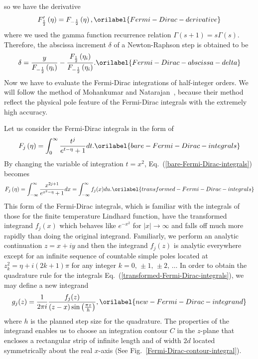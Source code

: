 \documentclass[aps,showkeys,noshowpacs,superscriptaddress,pre,preprint]{revtex4-2}
\let\label\orilabel
\begin{document}
so we have the derivative
\begin{equation}
F_{\frac{1}{2}}^\prime \left( \eta \right) 
= F_{-\frac{1}{2}} \left( \eta \right) ,
\label{Fermi-Dirac-derivative}
\end{equation}
where we used the gamma function recurrence relation 
$\Gamma \left( s + 1 \right) = s \Gamma \left( s \right)$.
Therefore, the abscissa increment $\delta$ of a Newton-Raphson step is obtained to be
\begin{equation}
\delta = \frac{y}{F_{-\frac{1}{2}} \left( \eta_i \right) } -
\frac{F_{\frac{1}{2}} \left( \eta_i \right) }{F_{- \frac{1}{2}} \left( \eta_i \right) } .
\label{Fermi-Dirac-abscissa-delta}
\end{equation}
Now we have to evaluate the Fermi-Dirac integrations of half-integer orders.
We will follow the method of Mohankumar and Natarajan~\cite{Mohankumar-Natarajan1995,Mohankumar-Natarajan1996},
because their method reflect the physical pole feature of the Fermi-Dirac integrals with the extremely high accuracy.

Let us consider the Fermi-Dirac integrals in the form of
\begin{equation}
F_j \left( \eta \right) = \int_0^\infty \frac{t^j}{e^{t-\eta} + 1} dt .
\label{bare-Fermi-Dirac-integrals}
\end{equation}
By changing the variable of integration $t = x^2$,
Eq.~(\ref{bare-Fermi-Dirac-integrals}) becomes
\begin{equation}
F_j \left( \eta \right) = \int_{-\infty}^{\infty} \frac{x^{2j+1}}{e^{x^2 - \eta} + 1} dx
= \int_{-\infty}^{\infty} {f_j (x)} du .
\label{transformed-Fermi-Dirac-integrals}
\end{equation}
This form of the Fermi-Dirac integrals, 
which is familiar with the integrals of those for the finite temperature Lindhard function,
have the transformed integrand ${f_j (x)}$ which behaves like $e^{- x^2}$ for $\left\vert x \right\vert \rightarrow \infty$
and falls off much more rapidly than doing the original integrand.
Familiarly, we perform an analytic continuation $z = x + i y$ and then
the integrand ${f_j (z)}$ is analytic everywhere except for 
an infinite sequence of countable simple poles located 
at $z_k^2 = \eta + i \left( 2k + 1 \right) \pi$
for any integer $k = 0, \, \pm 1 , \, \pm 2, \, \ldots$
In order to obtain the quadrature rule for the integrals Eq.~(\ref{transformed-Fermi-Dirac-integrals}),
we may define a new integrand
\begin{equation}
{g_j (z)} = \frac{1}{2\pi i} \frac{f_j (z)}{\left( z - x \right) {\sin\left( \frac{\pi z}{h} \right)}} ,
\label{new-Fermi-Dirac-integrand}
\end{equation}
where $h$ is the planned step size for the quadrature.
The properties of the integrand enables us to choose an integration contour $C$ in the $z$-plane
that encloses a rectangular strip of infinite length and of width $2d$ located symmetrically
about the real $x$-axis (See Fig.~\ref{Fermi-Dirac-contour-integral}).
\end{document}
